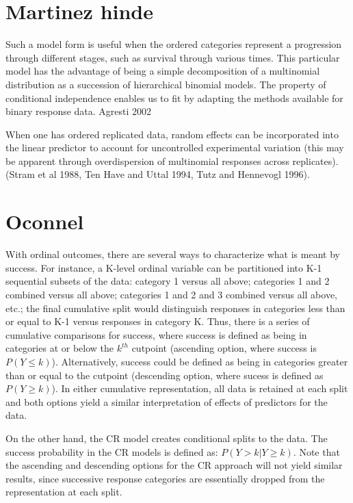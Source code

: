 \section{Martinez hinde}

Such a model form is useful when the ordered categories represent a progression through different stages, such as survival through various times. This particular model has the advantage of being a simple decomposition of a multinomial distribution as a succession of hierarchical binomial models. The property of conditional independence enables us to fit by adapting the methods available for binary response data. Agresti 2002

When one has ordered replicated data, random effects can be incorporated into the linear predictor to account for uncontrolled experimental variation (this may be apparent through overdispersion of multinomial responses across replicates). (Stram et al 1988, Ten Have and Uttal 1994, Tutz and Hennevogl 1996).

\section{Oconnel}

With ordinal outcomes, there are several ways to characterize what is meant by success. For instance, a K-level ordinal variable can be partitioned into K-1 sequential subsets of the data: category 1 versus all above; categories 1 and 2 combined versus all above; categories 1 and 2 and 3 combined versus all above, etc.; the final cumulative split would distinguish responses in categories less than or equal to K-1 versus responses in category K. Thus, there is a series of cumulative comparisons for success, where success is defined as being in categories at or below the $k^{th}$ cutpoint (ascending option, where success is $P(Y \leq k)$). Alternatively, success could be defined as being in categories greater than or equal to the cutpoint (descending option, where sucess is defined as $P(Y \geq k)$). In either cumulative representation, all data is retained at each split and both options yield a similar interpretation of effects of predictors for the data.

On the other hand, the CR model creates conditional splits to the data. The success probability in the CR models is defined as: $P(Y > k | Y \geq k)$. Note that the ascending and descending options for the CR approach will not yield similar results, since successive response categories are essentially dropped from the representation at each split.

